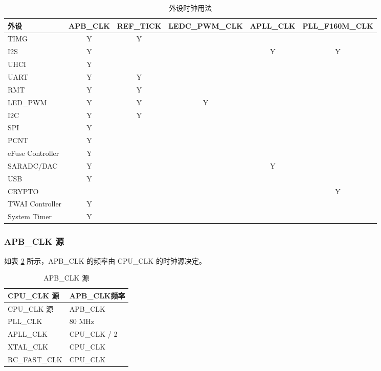 \documentclass[main\_\_CN.tex]{subfiles}
\begin{document}
\begin{longtable}[c]{|p{2.5cm}|c|c|c|c|c| }
 \caption{外设时钟用法}
    \label{table:peri clk owner} \\
  \hline
        \rowcolor{lightgray}
        外设 & APB\_CLK & REF\_TICK & LEDC\_PWM\_CLK & APLL\_CLK & PLL\_F160M\_CLK\\
        \hline
        TIMG & Y & Y &  &  &  \\
        \hline
        I2S & Y &  &  & Y & Y \\
        \hline
        UHCI & Y &  &  &  &  \\
        \hline
        UART & Y & Y &  &  &  \\
        \hline
        RMT & Y & Y &  &  &  \\
        \hline
        LED\_PWM & Y & Y & Y &  &  \\
        \hline
        I2C & Y & Y &  &  &  \\
        \hline
        SPI & Y &  &  &  &  \\
        \hline
        PCNT & Y &  &  &  &  \\
        \hline
        eFuse Controller & Y &  &  &  &  \\
        \hline
        SARADC/DAC & Y &  &  & Y &  \\
        \hline
        USB & Y &  &  &  &  \\
        \hline
        CRYPTO &  &  &  &  & Y \\
        \hline
        TWAI Controller & Y &  &  &  &  \\
        \hline
        System Timer & Y &  &  &  &  \\
        \hline
\end{longtable}

\subsubsection{APB\_CLK 源}

如表 \ref{table:apb_clk_src} 所示，APB\_CLK 的频率由 CPU\_CLK 的时钟源决定。

 \begin{longtable}[c]{ |p{7.5cm}|p{7.5cm}| }
      \caption{APB\_CLK 源}
    \label{table:apb_clk_src} \\
        \hline
        \rowcolor{lightgray}
        CPU\_CLK 源 & APB\_CLK频率 \\
        \hline
        \endfirsthead
        \hline
        \rowcolor{lightgray}
        CPU\_CLK 源 & APB\_CLK \\
        \hline
        \endhead
        \endfoot
        PLL\_CLK & 80 MHz \\
        \hline
        APLL\_CLK & CPU\_CLK / 2 \\
        \hline
        XTAL\_CLK & CPU\_CLK \\
        \hline
        RC\_FAST\_CLK & CPU\_CLK \\
        \hline
\end{longtable}
\end{document}
